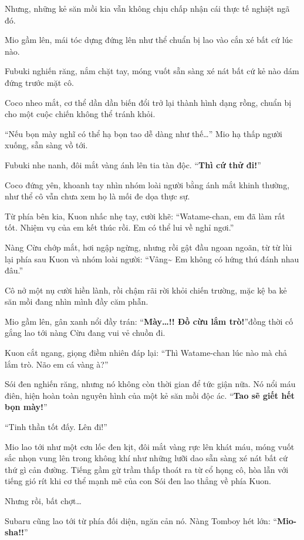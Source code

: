 \documentclass[../main.tex]{subfiles}
\begin{document}
Nhưng, những kẻ săn mồi kia vẫn không chịu chấp nhận cái thực tế nghiệt ngã đó.

Mio gầm lên, mái tóc dựng đứng lên như thể chuẩn bị lao vào cắn xé bất cứ lúc nào.

Fubuki nghiến răng, nắm chặt tay, móng vuốt sẵn sàng xé nát bất cứ kẻ nào dám đứng trước mặt cô.

Coco nheo mắt, cơ thể dần dần biến đổi trở lại thành hình dạng rồng, chuẩn bị cho một cuộc chiến không thể tránh khỏi.

``Nếu bọn mày nghĩ có thể hạ bọn tao dễ dàng như thế\dots'' Mio hạ thấp người xuống, sẵn sàng vồ tới.

Fubuki nhe nanh, đôi mắt vàng ánh lên tia tàn độc. ``\textbf{Thì cứ thử đi!}''

Coco đứng yên, khoanh tay nhìn nhóm loài người bằng ánh mắt khinh thường, như thể cô vẫn chưa xem họ là mối đe dọa thực sự.

Từ phía bên kia, Kuon nhấc nhẹ tay, cười khẽ: ``Watame-chan, em đã làm rất tốt. Nhiệm vụ của em kết thúc rồi. Em có thể lui về nghỉ ngơi.''

Nàng Cừu chớp mắt, hơi ngập ngừng, nhưng rồi gật đầu ngoan ngoãn, từ từ lùi lại phía sau Kuon và nhóm loài người: ``Vâng\~{} Em không có hứng thú đánh nhau đâu.''

Cô nở một nụ cười hiền lành, rồi chậm rãi rời khỏi chiến trường, mặc kệ ba kẻ săn mồi đang nhìn mình đầy căm phẫn.

Mio gầm lên, gân xanh nổi đầy trán: ``\textbf{Mày\dots!! Đồ cừu lắm trò!}''đồng thời cố gắng lao tới nàng Cừu đang vui vẻ chuồn đi.

Kuon cắt ngang, giọng điềm nhiên đáp lại: ``Thì Watame-chan lúc nào mà chả lắm trò. Não em cá vàng à?''

Sói đen nghiến răng, nhưng nó không còn thời gian để tức giận nữa. Nó nổi máu điên, hiện hoàn toàn nguyên hình của một kẻ săn mồi độc ác. ``\textbf{Tao sẽ giết hết bọn mày!}''

``Tinh thần tốt đấy. Lên đi!''

Mio lao tới như một cơn lốc đen kịt, đôi mắt vàng rực lên khát máu, móng vuốt sắc nhọn vung lên trong không khí như những lưỡi dao sẵn sàng xé nát bất cứ thứ gì cản đường. Tiếng gầm gừ trầm thấp thoát ra từ cổ họng cô, hòa lẫn với tiếng gió rít khi cơ thể mạnh mẽ của con Sói đen lao thẳng về phía Kuon.

Nhưng rồi, bất chợt\dots

Subaru cũng lao tới từ phía đối diện, ngăn cản nó. Nàng Tomboy hét lớn: ``\textbf{Mio-sha!!}''
\end{document}
